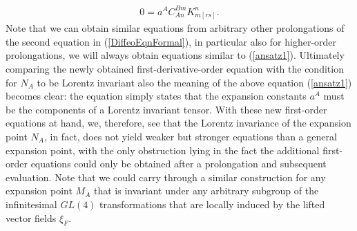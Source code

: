 \begin{align}\label{ansatz1}
    0 = a^A C^{Bm}_{An}  K_{m[rs]}^n.
\end{align}
Note that we can obtain similar equations from arbitrary other prolongations of the second equation in (\ref{DiffeoEqnFormal}), in particular also for higher-order prolongations, we will always obtain equations similar to (\ref{ansatz1}). Ultimately comparing the newly obtained first-derivative-order equation with the condition for $N_A$ to be Lorentz invariant also the meaning of the above equation (\ref{ansatz1}) becomes clear: the equation simply states that the expansion constants $a^A$ must be the components of a Lorentz invariant tensor. With these new first-order equations at hand, we, therefore, see that the Lorentz invariance of the expansion point $N_A$, in fact, does not yield weaker but stronger equations than a general expansion point, with the only obstruction lying in the fact the additional first-order equations could only be obtained after a prolongation and subsequent evaluation. Note that we could carry through a similar construction for any expansion point $M_A$ that is invariant under any arbitrary subgroup of the infinitesimal $GL(4)$ transformations that are locally induced by the lifted vector fields $\xi_F$. 


